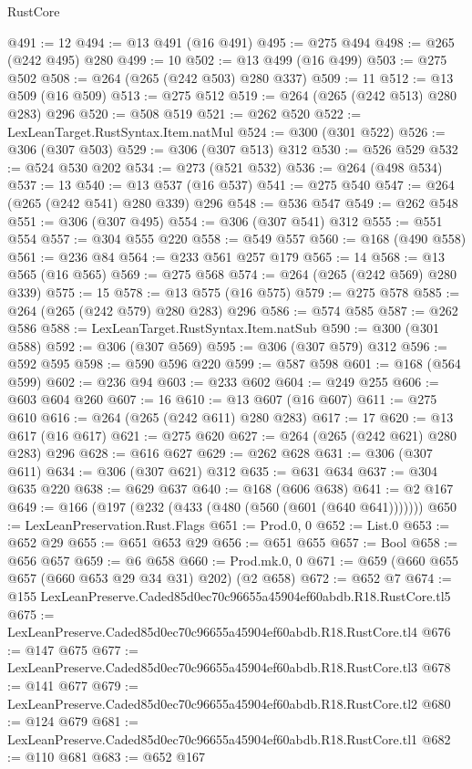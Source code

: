 \begin{lexlean}{RustCore}
\begin{coremodule}
@491 := 12
@494 := @13 @491 (@16 @491)
@495 := @275 @494
@498 := @265 (@242 @495) @280
@499 := 10
@502 := @13 @499 (@16 @499)
@503 := @275 @502
@508 := @264 (@265 (@242 @503) @280 @337)
@509 := 11
@512 := @13 @509 (@16 @509)
@513 := @275 @512
@519 := @264 (@265 (@242 @513) @280 @283) @296
@520 := @508 @519
@521 := @262 @520
@522 := LexLeanTarget.RustSyntax.Item.natMul
@524 := @300 (@301 @522)
@526 := @306 (@307 @503)
@529 := @306 (@307 @513) @312
@530 := @526 @529
@532 := @524 @530 @202
@534 := @273 (@521 @532)
@536 := @264 (@498 @534)
@537 := 13
@540 := @13 @537 (@16 @537)
@541 := @275 @540
@547 := @264 (@265 (@242 @541) @280 @339) @296
@548 := @536 @547
@549 := @262 @548
@551 := @306 (@307 @495)
@554 := @306 (@307 @541) @312
@555 := @551 @554
@557 := @304 @555 @220
@558 := @549 @557
@560 := @168 (@490 @558)
@561 := @236 @84
@564 := @233 @561 @257 @179
@565 := 14
@568 := @13 @565 (@16 @565)
@569 := @275 @568
@574 := @264 (@265 (@242 @569) @280 @339)
@575 := 15
@578 := @13 @575 (@16 @575)
@579 := @275 @578
@585 := @264 (@265 (@242 @579) @280 @283) @296
@586 := @574 @585
@587 := @262 @586
@588 := LexLeanTarget.RustSyntax.Item.natSub
@590 := @300 (@301 @588)
@592 := @306 (@307 @569)
@595 := @306 (@307 @579) @312
@596 := @592 @595
@598 := @590 @596 @220
@599 := @587 @598
@601 := @168 (@564 @599)
@602 := @236 @94
@603 := @233 @602
@604 := @249 @255
@606 := @603 @604 @260
@607 := 16
@610 := @13 @607 (@16 @607)
@611 := @275 @610
@616 := @264 (@265 (@242 @611) @280 @283)
@617 := 17
@620 := @13 @617 (@16 @617)
@621 := @275 @620
@627 := @264 (@265 (@242 @621) @280 @283) @296
@628 := @616 @627
@629 := @262 @628
@631 := @306 (@307 @611)
@634 := @306 (@307 @621) @312
@635 := @631 @634
@637 := @304 @635 @220
@638 := @629 @637
@640 := @168 (@606 @638)
@641 := @2 @167
@649 := @166 (@197 (@232 (@433 (@480 (@560 (@601 (@640 @641)))))))
@650 := LexLeanPreservation.Rust.Flags
@651 := Prod.{0, 0}
@652 := List.{0}
@653 := @652 @29
@655 := @651 @653 @29
@656 := @651 @655
@657 := Bool
@658 := @656 @657
@659 := @6 @658
@660 := Prod.mk.{0, 0}
@671 := @659 (@660 @655 @657 (@660 @653 @29 @34 @31) @202) (@2 @658)
@672 := @652 @7
@674 := @155 LexLeanPreserve.Caded85d0ec70c96655a45904ef60abdb.R18.RustCore.tl5
@675 := LexLeanPreserve.Caded85d0ec70c96655a45904ef60abdb.R18.RustCore.tl4
@676 := @147 @675
@677 := LexLeanPreserve.Caded85d0ec70c96655a45904ef60abdb.R18.RustCore.tl3
@678 := @141 @677
@679 := LexLeanPreserve.Caded85d0ec70c96655a45904ef60abdb.R18.RustCore.tl2
@680 := @124 @679
@681 := LexLeanPreserve.Caded85d0ec70c96655a45904ef60abdb.R18.RustCore.tl1
@682 := @110 @681
@683 := @652 @167

\end{coremodule}
\end{lexlean}
